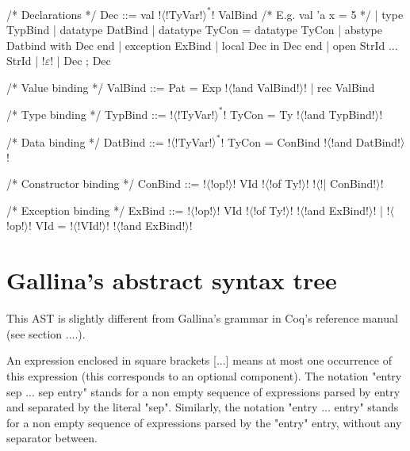 \documentclass[a4paper,11pt]{article}
\begin{document}
\begin{grm}
/* Declarations */
Dec ::= val !$\langle$!TyVar!$\rangle^*$! ValBind /* E.g. val 'a x = 5 */
      | type TypBind
      | datatype DatBind
      | datatype TyCon = datatype TyCon
      | abstype Datbind with Dec end
      | exception ExBind
      | local Dec in Dec end
      | open StrId ... StrId
      | !$\varepsilon$!
      | Dec ; Dec
      
/* Value binding */
ValBind ::= Pat = Exp !$\langle$!and ValBind!$\rangle$!
          | rec ValBind

/* Type binding */
TypBind ::= !$\langle$!TyVar!$\rangle^*$!  TyCon = Ty !$\langle$!and TypBind!$\rangle$!

/* Data binding */
DatBind ::= !$\langle$!TyVar!$\rangle^*$!  TyCon = ConBind !$\langle$!and DatBind!$\rangle$!

/* Constructor binding */
ConBind ::= !$\langle$!op!$\rangle$! VId !$\langle$!of Ty!$\rangle$! !$\langle$!| ConBind!$\rangle$!

/* Exception binding */
ExBind ::= !$\langle$!op!$\rangle$! VId !$\langle$!of Ty!$\rangle$! !$\langle$!and ExBind!$\rangle$!
         | !$\langle$!op!$\rangle$! VId = !$\langle$!VId!$\rangle$! !$\langle$!and ExBind!$\rangle$!
\end{grm}

\section{Gallina's abstract syntax tree}

This AST is slightly different from Gallina's grammar in Coq's reference manual
(see section ....).

An expression enclosed in square brackets [...] means at
most one occurrence of this expression (this corresponds to an optional
component). The notation "entry sep ... sep entry" stands for a non empty sequence
of expressions parsed by entry and separated by the literal "sep". Similarly,
the notation "entry ... entry" stands for a non empty sequence of expressions
parsed by the "entry" entry, without any separator between.
\end{document}
